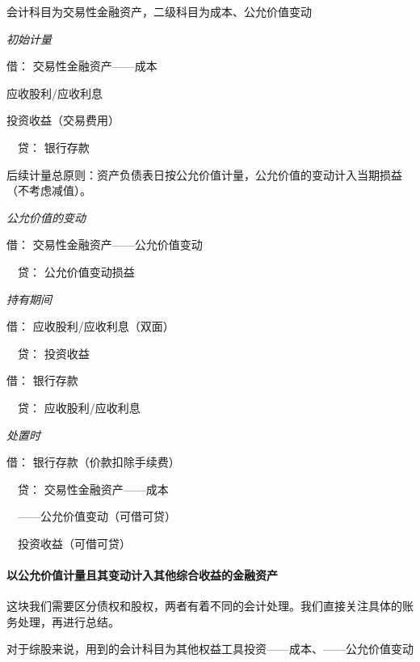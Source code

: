 \documentclass[UTF8,12pt]{ctexart}
\newenvironment{Dr}{\noindent 借：}{\par}
\newenvironment{Cr}{\noindent \ \ 贷：}{\par}
\numberwithin{equation}{section} %
\numberwithin{figure}{section}
\numberwithin{table}{section}
\begin{document}
	会计科目为交易性金融资产，二级科目为成本、公允价值变动
	
	\textit{初始计量}
	
	\begin{Dr}
		交易性金融资产——成本
		
		应收股利/应收利息
		
		投资收益（交易费用）
	\end{Dr}
	\begin{Cr}
		银行存款
	\end{Cr}

	
	后续计量总原则：资产负债表日按公允价值计量，公允价值的变动计入当期损益（不考虑减值）。
	
	\textit{公允价值的变动}
	
	\begin{Dr}
		交易性金融资产——公允价值变动
	\end{Dr}
	\begin{Cr}
		公允价值变动损益
	\end{Cr}

	\textit{持有期间}
	
	\begin{Dr}
		应收股利/应收利息（双面）
	\end{Dr}
	\begin{Cr}
		投资收益
	\end{Cr}
	\begin{Dr}
		银行存款
	\end{Dr}
	\begin{Cr}
		应收股利/应收利息
	\end{Cr}
	
	\textit{处置时}
	
	\begin{Dr}
		银行存款（价款扣除手续费）
	\end{Dr}
	\begin{Cr}
		交易性金融资产——成本
		
		\ \ ——公允价值变动（可借可贷）
		
		\ \ 投资收益（可借可贷）
	\end{Cr}	
	
	
	
	\paragraph{以公允价值计量且其变动计入其他综合收益的金融资产}
	这块我们需要区分债权和股权，两者有着不同的会计处理。我们直接关注具体的账务处理，再进行总结。
	
	对于综股来说，用到的会计科目为其他权益工具投资——成本、——公允价值变动
	
\end{document}
